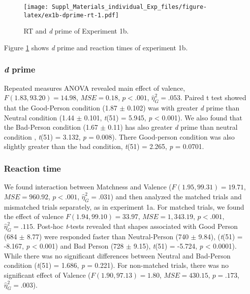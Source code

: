 \documentclass[
  english,
  man]{apa6}
\begin{document}
\begin{figure}
\centering
\texttt{[image: Suppl\_Materials\_individual\_Exp\_files/figure-latex/ex1b-dprime-rt-1.pdf]}
\caption{\label{fig:ex1b-dprime-rt}RT and \emph{d} prime of Experiment 1b.}
\end{figure}

Figure \ref{fig:ex1b-dprime-rt} shows \emph{d} prime and reaction times of experiment 1b.

\hypertarget{d-prime-1}{%
\subsubsection{\texorpdfstring{\emph{d} prime}{d prime}}\label{d-prime-1}}

Repeated measures ANOVA revealed main effect of valence, \(F(1.83, 93.20) = 14.98\), \(\mathit{MSE} = 0.18\), \(p < .001\), \(\hat{\eta}^2_G = .053\). Paired t test showed that the Good-Person condition (1.87 \(\pm\) 0.102) was with greater \emph{d} prime than Neutral condition (1.44 \(\pm\) 0.101, \emph{t}(51) = 5.945, \emph{p} \textless{} 0.001). We also found that the Bad-Person condition (1.67 \(\pm\) 0.11) has also greater \emph{d} prime than neutral condition , \emph{t}(51) = 3.132, \emph{p} = 0.008). There Good-person condition was also slightly greater than the bad condition, \emph{t}(51) = 2.265, \emph{p} = 0.0701.

\hypertarget{reaction-time-1}{%
\subsubsection{Reaction time}\label{reaction-time-1}}

We found interaction between Matchness and Valence (\(F(1.95, 99.31) = 19.71\), \(\mathit{MSE} = 960.92\), \(p < .001\), \(\hat{\eta}^2_G = .031\)) and then analyzed the matched trials and mismatched trials separately, as in experiment 1a. For matched trials, we found the effect of valence \(F(1.94, 99.10) = 33.97\), \(\mathit{MSE} = 1,343.19\), \(p < .001\), \(\hat{\eta}^2_G = .115\). Post-hoc \emph{t}-tests revealed that shapes associated with Good Person (684 \(\pm\) 8.77) were responded faster than Neutral-Person (740 \(\pm\) 9.84), (\emph{t}(51) = -8.167, \emph{p} \textless{} 0.001) and Bad Person (728 \(\pm\) 9.15), \emph{t}(51) = -5.724, \emph{p} \textless{} 0.0001). While there was no significant differences between Neutral and Bad-Person condition (\emph{t}(51) = 1.686, \emph{p} = 0.221). For non-matched trials, there was no significant effect of Valence (\(F(1.90, 97.13) = 1.80\), \(\mathit{MSE} = 430.15\), \(p = .173\), \(\hat{\eta}^2_G = .003\)).
\end{document}

